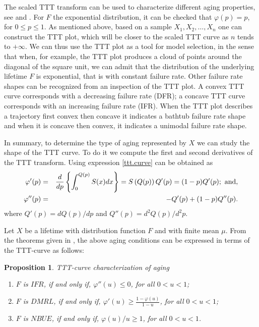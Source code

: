 \documentclass[preprint,12pt]{elsarticle}
\newtheorem{prp}{{\sc Proposition}}[section]
\newtheorem{ex}{{\sc Example}}[section]
\begin{document}
The scaled TTT transform can be used to characterize different aging properties, see \cite{BP75} and \cite{BK84}. For $F$ the exponential distribution, it can be checked that $\varphi(p)=p$, for $0 \leq p \leq 1$. As mentioned above, based on a sample $X_1,X_2,\ldots, X_n$ one can construct the TTT plot, which will be closer to the scaled TTT curve as $n$ tends to $+\infty$. We can thus use the TTT plot as a tool for model selection, in the sense that when, for example, the TTT plot produces a cloud of points around the diagonal of the square unit, we can admit that the distribution of the underlying lifetime $F$ is exponential, that is with constant failure rate. Other failure rate shapes can be recognized from an inspection of the TTT plot. A convex TTT curve corresponds with a decreasing failure rate (DFR); a concave TTT curve corresponds with an increasing failure rate (IFR). When the TTT plot describes a trajectory first convex then concave it indicates a bathtub failure rate shape and when it is concave then convex, it indicates a unimodal failure rate shape. 

In summary, to determine the type of aging represented by $X$ we can study the shape of the TTT curve. To do it we compute the first and second derivatives of the TTT transform. Using expression \eqref{ttt.curve} can be obtained as
\begin{eqnarray*}
\varphi'(p)&=& \frac{d}{d p}\left\{\int_0^{Q(p)}S(x)dx\right\}=S\left(Q(p)\right)Q'(p)=(1-p)Q'(p); \ {\rm and}, \\
\varphi''(p)&=& -Q'(p)+(1-p)Q''(p). 
\end{eqnarray*}
where $Q'(p)=dQ(p)/dp$ and $Q''(p)=d^2Q(p)/d^2p$.




Let $X$ be a lifetime with distribution function $F$ and with finite mean $\mu$. From the theorems given  in \cite{Klefsjo83}, the above aging conditions can be expressed in terms of the TTT-curve as follows:
\begin{prp} {TTT-curve characterization of aging} \

\begin{enumerate}
\item $ F$ is $ IFR$, if and only if, $ \varphi'' (u) \leq  0$, for all $0 <u <1$;
\item $F$ is $DMRL$, if and only if, $ \varphi'(u) \geq  \frac{1-\varphi(u)}{1-u}$, for all $0 <u <1$;
\item $F$ is $ NBUE$, if and only if, $\varphi(u)/u \geq  1$, for all $0 <u <1$.

\end{enumerate}
 \end{prp}
\end{document}
